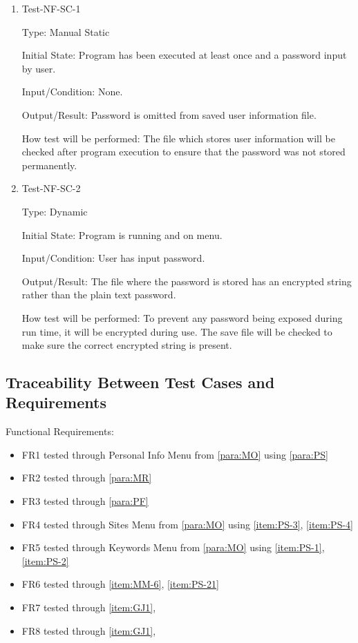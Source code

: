 \documentclass[12pt, titlepage]{article}
\makeatletter
\def\itemlabel#1#2{\def\@currentlabel{#2}\phantomsection\label{#1}}
\makeatother
\begin{document}
\begin{enumerate}

\itemlabel{para:NFSC}{Test-NF-SC-X}

\item{Test-NF-SC-1\\}

Type: Manual Static
					
Initial State: Program has been executed at least once and a password input by user. 
					
Input/Condition: None. 
					
Output/Result: Password is omitted from saved user information file. 
					
How test will be performed: The file which stores user information will be checked after program execution to ensure that the password was not stored permanently. 

\item{Test-NF-SC-2\\}

Type: Dynamic
					
Initial State: Program is running and on menu. 
					
Input/Condition: User has input password. 
					
Output/Result: The file where the password is stored has an encrypted string rather than the plain text password. 
					
How test will be performed: To prevent any password being exposed during run time, it will be encrypted during use. The save file will be checked to make sure the correct encrypted string is present.  

\end{enumerate}


\subsection{Traceability Between Test Cases and Requirements}

Functional Requirements:

\begin{itemize}
    \item FR1 tested through Personal Info Menu from \ref{para:MO} using \ref{para:PS}
    \item FR2 tested through \ref{para:MR} 
    \item FR3 tested through \ref{para:PF}
    \item FR4 tested through Sites Menu from \ref{para:MO} using \ref{item:PS-3}, \ref{item:PS-4}
    \item FR5 tested through Keywords Menu from \ref{para:MO} using \ref{item:PS-1}, \ref{item:PS-2}
    \item FR6 tested through \ref{item:MM-6}, \ref{item:PS-21}
    \item FR7 tested through \ref{item:GJ1},
    \item FR8 tested through \ref{item:GJ1},
\end{itemize}
\end{document}
